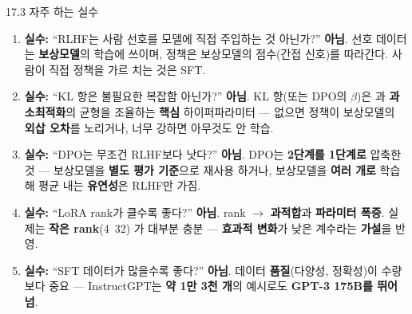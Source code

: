 \documentclass[aspectratio=169,11pt]{beamer}
\begin{document}
\begin{frame}{17.3 자주 하는 실수}
  \begin{enumerate}
    \item \textbf{실수:} ``RLHF는 사람 선호를 모델에 직접
      주입하는 것 아닌가?'' \textbf{아님}. 선호 데이터는
      \textbf{보상모델}의 학습에 쓰이며, 정책은 보상모델의
      점수(간접 신호)를 따라간다. 사람이 직접 정책을 가르
      치는 것은 SFT.
    \item \textbf{실수:} ``KL 항은 불필요한 복잡함 아닌가?''
      \textbf{아님}. KL 항(또는 DPO의 $\beta$)은
      과 \textbf{과소최적화}의 균형을
      조율하는 \textbf{핵심} 하이퍼파라미터 — 없으면
      정책이 보상모델의 \textbf{외삽 오차}를 노리거나,
      너무 강하면 아무것도 안 학습.
    \item \textbf{실수:} ``DPO는 무조건 RLHF보다 낫다?''
      \textbf{아님}. DPO는 \textbf{2단계를 1단계로} 압축한
      것 — 보상모델을 \textbf{별도 평가 기준}으로 재사용
     하거나, 보상모델을 \textbf{여러 개로} 학습해 평균
      내는 \textbf{유연성}은 RLHF만 가짐.
    \item \textbf{실수:} ``LoRA rank가 클수록 좋다?''
      \textbf{아님}. rank $\to$ \textbf{과적합}과
      \textbf{파라미터 폭증}. 실제는 \textbf{작은 rank}(4~32)
      가 대부분 충분 — \textbf{효과적 변화}가 낮은
      계수라는 \textbf{가설}을 반영.
    \item \textbf{실수:} ``SFT 데이터가 많을수록 좋다?''
      \textbf{아님}. 데이터 \textbf{품질}(다양성,
      정확성)이 수량보다 중요 — InstructGPT는
      \textbf{약 1만 3천 개}의 예시로도 \textbf{GPT-3
      175B를 뛰어넘}.
  \end{enumerate}
\end{frame}
\end{document}
